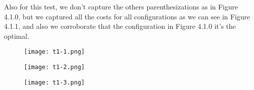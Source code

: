 \pagebreak

Also for this test, we don't capture the others parenthesizations as in Figure 4.1.0, but we captured all the costs for all configurations as we can see in Figure 4.1.1, and also we corroborate that the configuration in Figure 4.1.0 it's the optimal. \hfill \break

\begin{multicols}{3}
\begin{figure}[H]
\texttt{[image: t1-1.png]}
\centering \linebreak \linebreak
\end{figure} \hfill \break

\begin{figure}[H]
\texttt{[image: t1-2.png]}
\centering \linebreak {}
\end{figure} \hfill \break

\begin{figure}[H]
\texttt{[image: t1-3.png]}
\centering \linebreak \linebreak
\end{figure} \hfill \break
\end{multicols}

\pagebreak